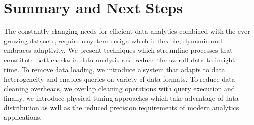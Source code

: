 \section{Summary and Next Steps}
\label{sec:conclusion}

The constantly changing needs for efficient data analytics combined 
with the ever growing datasets, require  a system design which is 
flexible, dynamic and embraces adaptivity. We present techniques 
which streamline processes that constitute bottlenecks in data 
analysis and reduce the overall data-to-insight time. To remove data 
loading, we introduce a system that adapts to data heterogeneity and 
enables queries on variety of data formats. To reduce data cleaning 
overheads, we overlap cleaning operations with query execution and 
finally, we introduce physical tuning approaches which take advantage 
of data distribution as well as the reduced precision requirements of 
modern analytics applications.